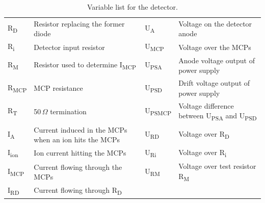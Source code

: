 		
		
		\begin{table}[h]
			\begin{center}
			\begin{tabular}{|m{1.5cm}|m{5.4cm}|m{1.5cm}|m{5.4cm}|}
				\hline
				R\textsubscript{D}& Resistor replacing the former diode & U\textsubscript{A}& Voltage on the detector anode \\
				R\textsubscript{i} & Detector input resistor & U\textsubscript{MCP}& Voltage over the MCPs \\
				R\textsubscript{M}& Resistor used to determine I\textsubscript{MCP} &U\textsubscript{PSA} & Anode voltage output of power supply \\
				R\textsubscript{MCP}& MCP resistance & U\textsubscript{PSD} & Drift voltage output of power supply \\
				R\textsubscript{T} & 50\,$\Omega$ termination & U\textsubscript{PSMCP} & Voltage difference  between U\textsubscript{PSA} and U\textsubscript{PSD} \\
				I\textsubscript{A} & Current induced in the MCPs when an ion hits the MCPs & U\textsubscript{RD}& Voltage over R\textsubscript{D} \\
				I\textsubscript{ion} & Ion current hitting the MCPs & U\textsubscript{Ri}& Voltage over R\textsubscript{i} \\
				I\textsubscript{MCP} & Current flowing through the MCPs &U\textsubscript{RM}& Voltage over test resistor R\textsubscript{M}\\
				I\textsubscript{RD} & Current flowing through R\textsubscript{D} &&\\
				\hline
			\end{tabular}
			\end{center}
			\caption{Variable list for the detector.}
			\label{tab:ElecSchemaVariableList}
		\end{table}
